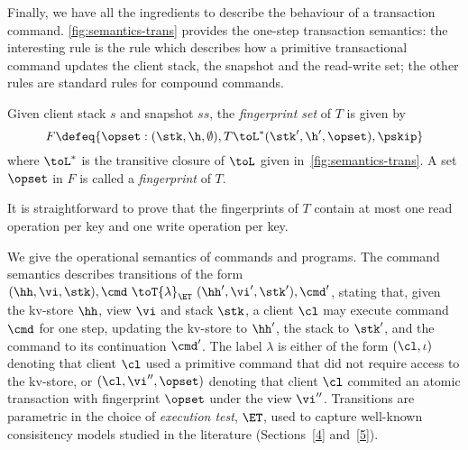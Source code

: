 Finally, we have all the ingredients to describe the behaviour of  a
transaction command.  \cref{fig:semantics-trans} provides the
one-step transaction semantics: the  interesting rule is the 
rule which describes how a primitive transactional command updates
the client stack, the snapshot and the read-write set; the other
rules are standard rules for compound commands. 



\begin{definition}
Given client stack $s$
and snapshot $ss$, the \emph{fingerprint set } of $T$ is given by 
\[F \defeq
\{\opset : (\stk, \h, \emptyset), T \toL^* (\stk', \h', \opset),
\pskip \}
\]
 where $\toL^*$ is the transitive closure of $\toL$ given
 in~\cref{fig:semantics-trans}.  A set $\opset$ in $F$ is called a
 \emph{fingerprint} of $T$. 
\end{definition}
\noindent It is straightforward to prove that the  fingerprints of $T$ contain at most one read operation per key and
one write operation per key. \\


 We give the operational
semantics of commands and programs. The command semantics describes
transitions of the form
$(\hh, \vi, \stk), \cmd \ \toT{\lambda}_{\ET} \ (\hh', \vi', \stk') ,
\cmd'$, stating that, given the kv-store $\hh$, view $\vi$ and stack
$\stk$, a client $\cl$ may execute command $\cmd$ for one step, updating the
kv-store to $\hh'$, the stack to $\stk'$, and the command to its
continuation $\cmd'$.  The label $\lambda$ is either of the form
$(\cl, \iota)$ denoting that client $\cl$ used a primitive command
that did not require access to the kv-store, or
$(\cl, \vi'', \opset)$ denoting that client $\cl$ commited an atomic
transaction with fingerprint $\opset$ under the view $\vi''$.
Transitions are parametric in the choice of \emph{execution test},
$\ET$,  used to capture well-known consisitency models studied in the literature
(Sections~\ref{4}
and~\ref{5}). 




